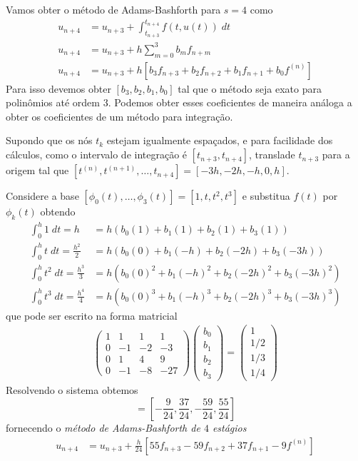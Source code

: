 \begin{ex}
Vamos obter o método de Adams-Bashforth para $s=4$ como
\begin{eqnarray}
  u_{n+4}  &= u_{n+3}  + \int _{t_{n+3}}^{t_{n+4}} f(t,u(t)) \; dt \\
  u_{n+4}  &= u_{n+3}  + h \sum_{m=0}^{3} b_m f_{n+m} \\
  u_{n+4}  &= u_{n+3}  + h [b_3f_{n+3} +b_2f_{n+2} +b_1f_{n+1} +b_0f^{(n)}]
\end{eqnarray}
Para isso devemos obter $[b_3,b_2,b_1,b_0]$ tal que o método seja exato para polinômios até ordem $3$. Podemos obter esses coeficientes de maneira análoga a obter os coeficientes de um método para integração.

Supondo que os nós $t_k$ estejam igualmente espaçados, e para facilidade dos cálculos, como o intervalo de integração é $[t_{n+3},t_{n+4}]$, translade $t_{n+3}$ para a origem tal que $[t^{(n)},t^{(n+1)},\ldots ,t_{n+4}]=[-3h,-2h,-h,0,h]$.

Considere a base $[\phi _0(t),\ldots ,\phi _3(t)]=[1, t, t^2, t^3]$ e substitua $f(t)$ por $\phi _k(t)$ obtendo
\begin{eqnarray*}
  \int _0^{h} 1  \;dt = h             &= h( b_0(1)  +b_1(1)    + b_2(1)   + b_3(1)    )\\
  \int _0^{h} t  \;dt = \frac{h^2}{2}  &= h( b_0(0)  +b_1(-h)   + b_2(-2h) + b_3(-3h)  )\\
  \int _0^{h} t^2 \;dt = \frac{h^3}{3}  &= h( b_0(0)^2 +b_1(-h)^2  + b_2(-2h)^2+ b_3(-3h)^2 )\\
  \int _0^{h} t^3 \;dt = \frac{h^4}{4} &= h( b_0(0)^3 +b_1(-h)^3  + b_2(-2h)^3+ b_3(-3h)^3 )
\end{eqnarray*}
que pode ser escrito na forma matricial
\begin{eqnarray}
\left(
  \begin{array}{cccc}
    1  &  1    & 1   & 1\\
    0  &  -1   & -2  & -3\\
    0  &  1    & 4   &  9\\
    0  &  -1   & -8  & -27
  \end{array}
\right)
\left(\begin{array}{c}  b_0 \\ b_1\\ b_2\\b_3   \end{array}\right)
=
\left(\begin{array}{c}  1  \\ 1/2 \\ 1/3 \\ 1/4  \end{array}\right)
\end{eqnarray}
Resolvendo o sistema obtemos
\begin{equation} [b_0,b_1,b_2,b_3]=[-\frac{9}{24},\frac{37}{24},-\frac{59}{24},\frac{55}{24}] \end{equation}
fornecendo o \emph{método de Adams-Bashforth de $4$ estágios}
\begin{eqnarray}\label{AB4}
  u_{n+4}  &= u_{n+3}  + \frac{h}{24} [55 f_{n+3} -59f_{n+2} +37f_{n+1} -9f^{(n)}]
\end{eqnarray}
\end{ex}

